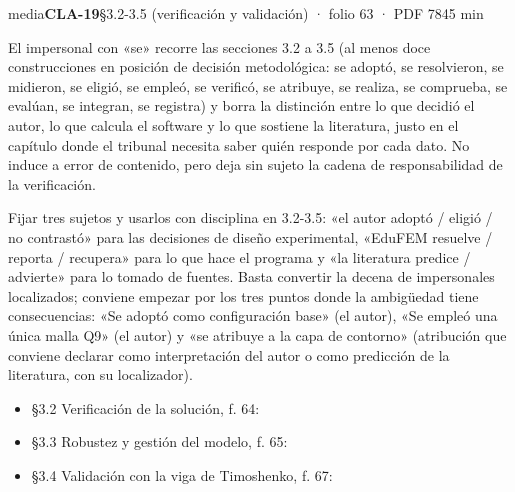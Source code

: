 \begin{ficha}{media}{\casilla\textbf{CLA-19}\quad{}\quad §3.2-3.5 (verificación y validación) · folio 63 · PDF 78\hfill 45 min}
\par
{}El impersonal con «se» recorre las secciones 3.2 a 3.5 (al menos doce construcciones en posición de decisión metodológica: se adoptó, se resolvieron, se midieron, se eligió, se empleó, se verificó, se atribuye, se realiza, se comprueba, se evalúan, se integran, se registra) y borra la distinción entre lo que decidió el autor, lo que calcula el software y lo que sostiene la literatura, justo en el capítulo donde el tribunal necesita saber quién responde por cada dato. No induce a error de contenido, pero deja sin sujeto la cadena de responsabilidad de la verificación.\par
{}Fijar tres sujetos y usarlos con disciplina en 3.2-3.5: «el autor adoptó /\allowbreak{} eligió /\allowbreak{} no contrastó» para las decisiones de diseño experimental, «EduFEM resuelve /\allowbreak{} reporta /\allowbreak{} recupera» para lo que hace el programa y «la literatura predice /\allowbreak{} advierte» para lo tomado de fuentes. Basta convertir la decena de impersonales localizados; conviene empezar por los tres puntos donde la ambigüedad tiene consecuencias: «Se adoptó como configuración base» (el autor), «Se empleó una única malla Q9» (el autor) y «se atribuye a la capa de contorno» (atribución que conviene declarar como interpretación del autor o como predicción de la literatura, con su localizador).\par
{}\begin{itemize}[leftmargin=1.2em,itemsep=1pt,topsep=1pt]
\item {\small §3.2 Verificación de la solución, f. 64: }
\item {\small §3.3 Robustez y gestión del modelo, f. 65: }
\item {\small §3.4 Validación con la viga de Timoshenko, f. 67: }
\end{itemize}
\end{ficha}
